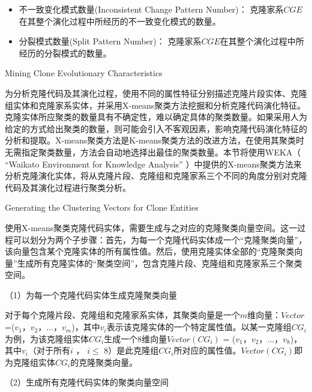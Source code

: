 \begin{itemize}
\item
不一致变化模式数量(Inconsistent Change Pattern Number)：
克隆家系{$CGE$}在其整个演化过程中所经历的不一致变化模式的数量。
\item
分裂模式数量(Split Pattern Number)：
克隆家系{$CGE$}在其整个演化过程中所经历的分裂模式的数量。
\end{itemize}

{Mining Clone Evolutionary Characteristics}

为分析克隆代码及其演化过程，使用不同的属性特征分别描述克隆片段实体、克隆组实体和克隆家系实体，并采用X-means\cite{pelleg2000x}聚类方法挖掘和分析克隆代码演化特征。克隆实体所应聚类的数量具有不确定性，难以确定具体的聚类数量。如果采用人为给定的方式给出聚类的数量，则可能会引入不客观因素，影响克隆代码演化特征的分析和提取。X-means聚类方法是K-means聚类方法的改进方法，在使用其聚类时无需指定聚类数量，方法会自动地选择出最佳的聚类数量。本节将使用WEKA（ “Waikato Environment for Knowledge Analysis” \cite{hall2009weka}）中提供的X-means聚类方法来分析克隆演化实体，将从克隆片段、克隆组和克隆家系三个不同的角度分别对克隆代码及其演化过程进行聚类分析。

{Generating the Clustering Vectors for Clone Entities}

使用X-means聚类克隆代码实体，需要生成与之对应的克隆聚类向量空间。这一过程可以划分为两个子步骤：首先，为每一个克隆代码实体成一个“克隆聚类向量”，该向量包含某个克隆实体的所有属性值。然后，使用克隆实体全部的“克隆聚类向量”生成所有克隆实体的“聚类空间”，包含克隆片段、克隆组和克隆家系三个聚类空间。

（1）为每一个克隆代码实体生成克隆聚类向量

对于每个克隆片段、克隆组和克隆家系实体，其聚类向量是一个$m$维向量：{$Vector$ ={($v_1$，$v_2$，$...$，$v_m$)}}，其中$v_i$表示该克隆实体的一个特定属性值。以某一克隆组{$CG_i$}为例，为该克隆组实体{$CG_i$}生成一个8维向量{$Vector(CG_i)$ = ($v_1$，$v_2$，$...$，$v_8$)}，其中$v_i$（对于所有$i$ ， $i \leq $ 8）是此克隆组{$CG_i$}所对应的属性值。$Vector(CG_i)$即为克隆组实体{$CG_i$}的克隆聚类向量。
 
（2）生成所有克隆代码实体的聚类向量空间

